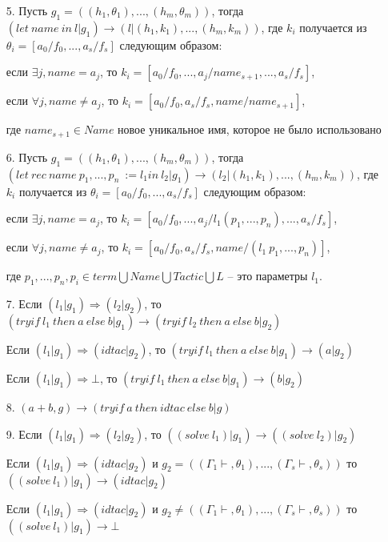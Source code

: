 \documentclass[12pt]{article}
\begin{document}
\begin{enumerate}
    \item[5.] Пусть $g_1 = ((h_{1}, \theta_1), ..., (h_{m}, \theta_m))$, тогда 
    $(let\ name\ in\ l|g_1) \xrightarrow{} (l|(h_{1}, k_1), ..., (h_{m}, k_m))$, где $k_i$ получается из $\theta_i=[a_0/f_0,...,a_s/f_s]$ следующим образом: 
    \item[]   если $\exists j, name = a_j$, 
    то $k_i = [a_0/f_0,...,a_j/name_{s+1},..., a_s/f_s]$, 
    \item[]   если $\forall j,name \neq a_j$, 
    то $k_i = [a_0/f_0, a_s/f_s, name/name_{s+1}]$, 
    \item[]   где $name_{s+1} \in Name$ новое уникальное имя, которое не было использовано
    \item[6.] Пусть $g_1 = ((h_{1}, \theta_1), ..., (h_{m}, \theta_m))$, тогда 
    $(let\ rec\ name\ p_1,...,p_n\ := l_1 in\ l_2|g_1) \xrightarrow{} (l_2|(h_{1}, k_1), ..., (h_{m}, k_m))$, где $k_i$ получается из $\theta_i=[a_0/f_0,..., a_s/f_s]$ следующим образом: 
    \item[]   если $\exists j, name = a_j$, 
    то $k_i = [a_0/f_0,...,a_j/l_1(p_1,...,p_n),..., a_s/f_s]$, 
    \item[]   если $\forall j,name \neq a_j$, 
    то $k_i = [a_0/f_0, a_s/f_s, name/(l_1\ p_1,...,p_n)]$, 
    \item[]   где $p_1,...,p_n, p_i \in term \bigcup Name \bigcup Tactic \bigcup L$ -- это параметры $l_1$.

    
    \item[7.] Если $(l_1|g_1) \Rightarrow (l_2|g_2)$, то
    $(tryif\ l_1\ then\ a\ else\ b|g_1) \xrightarrow{} (tryif\ l_2\ then\ a\ else\ b|g_2)$
    \item[]   Если $(l_1|g_1) \Rightarrow (idtac|g_2)$, то
    $(tryif\ l_1\ then\ a\ else\ b|g_1) \xrightarrow{} (a|g_2)$
    \item[]   Если $(l_1|g_1) \Rightarrow \bot$, то
    $(tryif\ l_1\ then\ a\ else\ b|g_1) \xrightarrow{} (b|g_2)$
    \item[8.] $(a+b,g) \xrightarrow{} (tryif\ a\ then\ idtac\ else\ b| g)$
    \item[9.] Если $(l_1|g_1) \Rightarrow (l_2|g_2)$, то
    $((solve\ l_1)|g_1) \xrightarrow{} ((solve\ l_2)|g_2)$
    \item[]   Если $(l_1|g_1) \Rightarrow{} (idtac|g_2)$ и $g_2 = ((\Gamma_1 \vdash, \theta_1),...,(\Gamma_s \vdash, \theta_s))$ то
    $((solve\ l_1)|g_1) \xrightarrow{} (idtac|g_2)$
    \item[]   Если $(l_1|g_1) \Rightarrow{} (idtac|g_2)$ и $g_2 \neq ((\Gamma_1 \vdash, \theta_1),...,(\Gamma_s \vdash, \theta_s))$ то
    $((solve\ l_1)|g_1) \xrightarrow{} \bot$


\end{enumerate}
\end{document}
